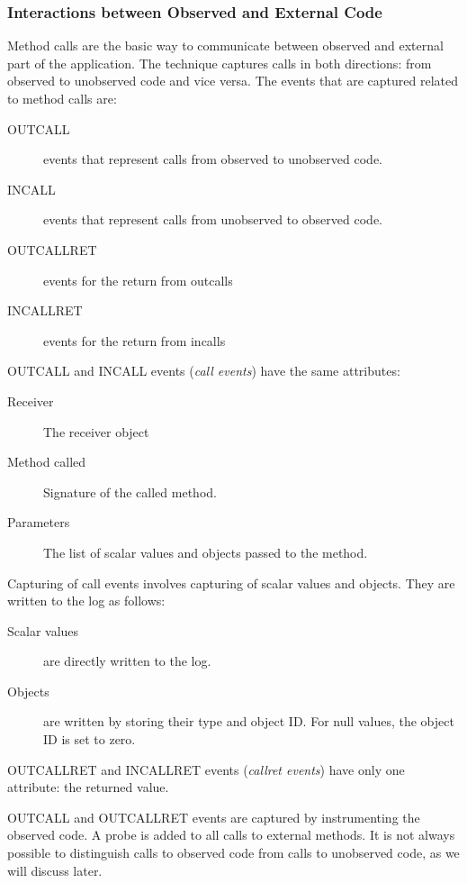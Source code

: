 \subsubsection {Interactions between Observed and External Code}
Method calls are the basic way to communicate between observed and external part of the application. The technique captures calls in both directions: from observed to unobserved code and vice versa. The events that are captured related to method calls are:

\begin{description}
 \item  [OUTCALL] events that represent calls from observed to unobserved code.
 \item [INCALL] events that represent calls from unobserved to observed code.
 \item [OUTCALLRET] events for the return from outcalls
 \item [INCALLRET] events for the return from incalls
\end{description}

OUTCALL and INCALL events (\emph {call events})  have the same attributes:

\begin{description}
 \item [Receiver] The receiver object
 \item [Method called] Signature of the called method.
 \item [Parameters] The list of scalar values and objects passed to the method.
\end{description}

Capturing of call events involves capturing of scalar values and objects. They are written to the log as follows:

\begin{description}
 \item [Scalar values] are directly written to the log.
 \item [Objects] are written by storing their type and object ID. For null values, the object ID is set to zero. 
\end{description}

OUTCALLRET and INCALLRET events (\emph{callret events}) have only one attribute: the returned value.

OUTCALL and OUTCALLRET events are captured by instrumenting the observed code. A probe is added to all calls to external methods. It is not always possible to distinguish calls to observed code from calls to unobserved code, as we will discuss later.

